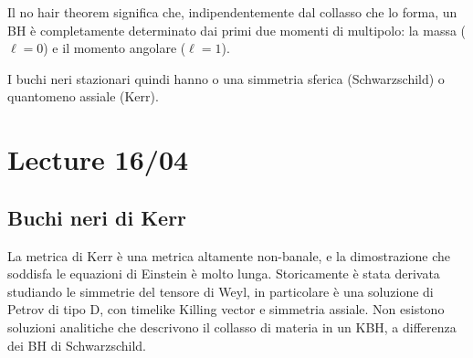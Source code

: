 Il no hair theorem significa che, indipendentemente dal collasso che lo forma, un BH è completamente determinato dai primi due momenti di multipolo: la massa ($ \ell = 0 $) e il momento angolare ($ \ell = 1 $).

I buchi neri stazionari quindi hanno o una simmetria sferica (Schwarzschild) o quantomeno assiale (Kerr).

\chapter{Lecture 16/04}

\section{Buchi neri di Kerr}

La metrica di Kerr è una metrica altamente non-banale, e la dimostrazione che soddisfa le equazioni di Einstein è molto lunga. Storicamente è stata derivata studiando le simmetrie del tensore di Weyl, in particolare è una soluzione di Petrov di tipo D, con timelike Killing vector e simmetria assiale. Non esistono soluzioni analitiche che descrivono il collasso di materia in un KBH, a differenza dei BH di Schwarzschild.

